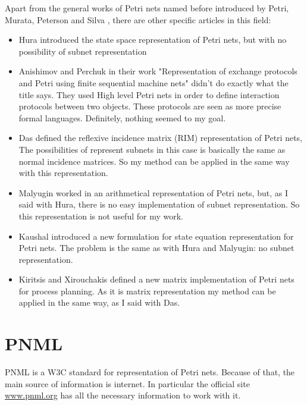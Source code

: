 Apart from the general works of Petri nets named before
introduced by Petri, Murata, Peterson and Silva \citep{G-Petri1962PhD,G-Petri1966,G-Petri1976,G-Murata1977412,G-SM-Murata19772,G-EPN-Peterson1981,G-Silva1985,G-Murata1989541,G-Silva1993,G-Silva201213},
there are other specific articles in this field:
\begin{itemize}
\item Hura \cite{REP-Hura1984865} introduced the state space representation of Petri nets, but with no possibility of subnet representation
\item Anishimov and Perchuk \cite{REP-Anisimov198690} in their work "Representation
of exchange protocols and Petri using finite sequential machine nets" didn't do exactly what the title says. They used High level Petri nets in order to define interaction protocols between two objects. These protocols are seen as more precise formal languages. Definitely, nothing seemed to my goal.   
\item Das \cite{REP-Das1987643} defined the
reflexive incidence matrix (RIM) representation of Petri nets, The possibilities
of represent subnets in this case is basically the same as 
normal incidence matrices. So my method can be applied in the same way with
this representation.
\item Malyugin \cite{REP-Malyugin1987696} worked in an arithmetical representation
of Petri nets, but, as I said with Hura, there is no easy implementation
of subnet representation.
So this representation is not useful for my work.
\item Kaushal \cite{REP-Kaushal19921083} introduced a new formulation for
state equation representation for Petri nets. The problem is the same as
with Hura and Malyugin: no subnet representation.
\item Kiritsis and Xirouchakis \cite{REP-Kiritisis2001173} defined a new
matrix implementation of Petri nets for process planning. As it is matrix representation my method can be applied in the same way, as I said with Das.  \end{itemize}
 

\section{PNML}
PNML is a W3C standard for representation of Petri nets. Because of that, the
main source of information is internet. In particular the official site \url{www.pnml.org}
\cite{PNML-pnml.org} has all the necessary information to work with it.


